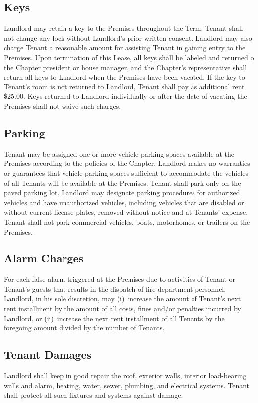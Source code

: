 \documentclass{article}
\begin{document}
\subsection{Keys}
Landlord may retain a key to the Premises throughout the Term. Tenant shall not
change any lock without Landlord’s prior written consent. Landlord may also
charge Tenant a reasonable amount for assisting Tenant in gaining entry to the
Premises. Upon termination of this Lease, all keys shall be labeled and returned
o the Chapter president or house manager, and the Chapter’s representative shall
return all keys to Landlord when the Premises have been vacated. If the key to
Tenant’s room is not returned to Landlord, Tenant shall pay as additional rent
\$25.00. Keys returned to Landlord individually or after the date of vacating
the Premises shall not waive such charges.

\subsection{Parking}
Tenant may be assigned one or more vehicle parking spaces available at the
Premises according to the policies of the Chapter. Landlord makes no warranties
or guarantees that vehicle parking spaces sufficient to accommodate the vehicles
of all Tenants will be available at the Premises. Tenant shall park only on the
paved parking lot. Landlord may designate parking procedures for authorized
vehicles and have unauthorized vehicles, including vehicles that are disabled or
without current license plates, removed without notice and at Tenants’ expense.
Tenant shall not park commercial vehicles, boats, motorhomes, or trailers on the
Premises.

\subsection{Alarm Charges}
For each false alarm triggered at the Premises due to activities of Tenant or
Tenant’s guests that results in the dispatch of fire department personnel,
Landlord, in his sole discretion, may (i)~increase the amount of Tenant’s next
rent installment by the amount of all costs, fines and/or penalties incurred by
Landlord, or (ii)~increase the next rent installment of all Tenants by the
foregoing amount divided by the number of Tenants.

\subsection{Tenant Damages}
Landlord shall keep in good repair the roof, exterior walls, interior
load-bearing walls and alarm, heating, water, sewer, plumbing, and electrical
systems. Tenant shall protect all such fixtures and systems against damage.
\end{document}
